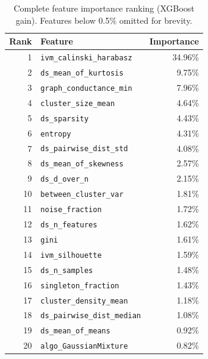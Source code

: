 \documentclass[10pt]{article} %
\begin{document}
\begin{table}[h]
\centering
\caption{Complete feature importance ranking (XGBoost gain). Features below 0.5\% omitted for brevity.}
\label{tab:app_importance}
\small
\begin{tabular}{rlr}
\toprule
\textbf{Rank} & \textbf{Feature} & \textbf{Importance} \\
\midrule
1 & \texttt{ivm\_calinski\_harabasz} & 34.96\% \\
2 & \texttt{ds\_mean\_of\_kurtosis} & 9.75\% \\
3 & \texttt{graph\_conductance\_min} & 7.96\% \\
4 & \texttt{cluster\_size\_mean} & 4.64\% \\
5 & \texttt{ds\_sparsity} & 4.43\% \\
6 & \texttt{entropy} & 4.31\% \\
7 & \texttt{ds\_pairwise\_dist\_std} & 4.08\% \\
8 & \texttt{ds\_mean\_of\_skewness} & 2.57\% \\
9 & \texttt{ds\_d\_over\_n} & 2.15\% \\
10 & \texttt{between\_cluster\_var} & 1.81\% \\
11 & \texttt{noise\_fraction} & 1.72\% \\
12 & \texttt{ds\_n\_features} & 1.62\% \\
13 & \texttt{gini} & 1.61\% \\
14 & \texttt{ivm\_silhouette} & 1.59\% \\
15 & \texttt{ds\_n\_samples} & 1.48\% \\
16 & \texttt{singleton\_fraction} & 1.43\% \\
17 & \texttt{cluster\_density\_mean} & 1.18\% \\
18 & \texttt{ds\_pairwise\_dist\_median} & 1.08\% \\
19 & \texttt{ds\_mean\_of\_means} & 0.92\% \\
20 & \texttt{algo\_GaussianMixture} & 0.82\% \\
\bottomrule
\end{tabular}
\end{table}
\end{document}
